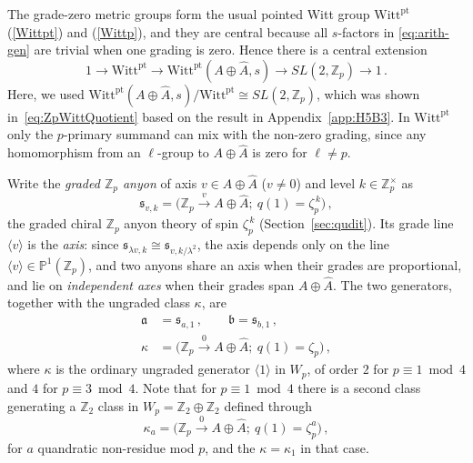 \documentclass[aps,twocolumn,prx,floatfix,preprintnumbers, nofootinbib,10pt]{revtex4-2}
\numberwithin{equation}{section}
\theoremstyle{definition}
\theoremstyle{remark}
\theoremstyle{claim}
\newcommand{\be}{\begin{equation}}
\newcommand{\ee}{\end{equation}}
\newcommand{\ba}{\begin{aligned}}
\newcommand{\ea}{\end{aligned}}
\newcommand{\ga}{\mathfrak{a}}
\newcommand{\gb}{\mathfrak{b}}
\newcommand{\Z}{{\mathbb Z}}
\newcommand{\Witt}{\text{Witt}}
\newcommand{\pt}{\text{pt}}
\begin{document}
\medskip{}
The grade-zero metric groups form the usual pointed Witt group $\Witt^\pt$ (\ref{Wittpt}) and (\ref{Wittp}), and
they are central because all $s$-factors in \eqref{eq:arith-gen} are trivial when
one grading is zero.  Hence there is a central extension
\be\label{eq:oddp-exact}
  1\longrightarrow \Witt^\pt
  \longrightarrow \Witt^\pt(A\oplus\widehat A,s)
  \longrightarrow SL(2,\Z_p)
  \longrightarrow 1 \,.
\ee
Here, we used $\Witt^{\pt}(A\oplus\widehat A, s)/\Witt^{\pt} \cong SL(2, \Z_p)$, which was shown in~\eqref{eq:ZpWittQuotient} based on the result in Appendix~\ref{app:H5B3}.
In $\Witt^\pt$ only the $p$-primary summand can mix with the non-zero grading, since any
homomorphism from an $\ell$-group to $A\oplus\widehat A$ is zero for $\ell\neq p$.

\medskip{}
Write the {\it graded $\Z_p$ anyon} of axis $v\in A\oplus\widehat A$ ($v\neq0$)
and level $k\in\Z_p^\times$ as
\be\label{eq:semionvk}
  \mathfrak s_{v,k}=\big(\Z_p\xrightarrow{\ v\ }A\oplus\widehat A;\ q(1)=\zeta_p^{\,k}\big)\,,
\ee
the graded chiral $\Z_p$ anyon theory of spin $\zeta_p^{\,k}$ (Section~\ref{sec:qudit}).
Its grade line $\langle v\rangle$ is the {\it axis}: since
$\mathfrak s_{\lambda v,k}\cong\mathfrak s_{v,k/\lambda^2}$, the axis depends only
on the line $\langle v\rangle\in\mathbb P^1(\Z_p)$, and two anyons share
an axis when their grades are proportional, and lie on {\it independent axes}
when their grades span $A\oplus\widehat A$.  The two generators, together with the
ungraded class $\kappa$, are
\be\label{eq:gensp}
\ba
  \ga&=\mathfrak s_{a,1}\,,\qquad \gb=\mathfrak s_{b,1}\,,\\
  \kappa&=\big(\Z_p\xrightarrow{0}A\oplus\widehat A;\ q(1)=\zeta_p\big)\,,
\ea
\ee
where $\kappa$ is the ordinary ungraded generator $\langle1\rangle$ in $W_p$, of
order $2$ for $p\equiv1\bmod4$ and $4$ for $p\equiv3\bmod4$.
Note that for $p\equiv1\bmod4$ there is a second class generating a $\Z_2$ class in $W_p=\Z_2 \oplus\Z_2$ defined through 
\be 
\kappa_a=\big(\Z_p\xrightarrow{0}A\oplus\widehat A;\ q(1)=\zeta_p^{a}\big)\,,
\ee
for $a$ quandratic non-residue mod $p$, and the $\kappa =\kappa_1$ in that case. 
\end{document}
